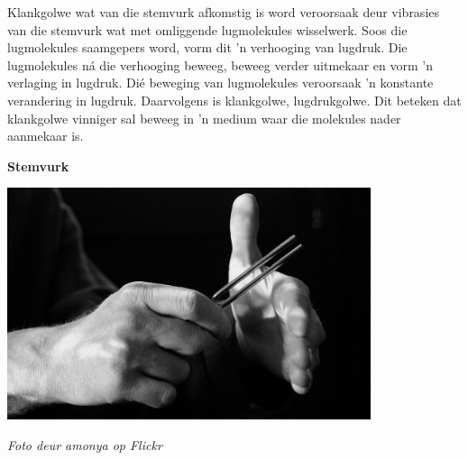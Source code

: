 \begin{minipage}{.5\textwidth}
Klankgolwe wat van die stemvurk afkomstig is word veroorsaak deur vibrasies van die stemvurk wat met omliggende lugmolekules wisselwerk. Soos die lugmolekules saamgepers word, vorm dit  'n verhooging van lugdruk. Die lugmolekules n\'a die verhooging beweeg, beweeg verder uitmekaar en vorm  'n verlaging in lugdruk. Di\'{e} beweging van lugmolekules veroorsaak  'n konstante verandering in lugdruk. Daarvolgens is klankgolwe, lugdrukgolwe. Dit beteken dat klankgolwe vinniger sal beweeg in  'n medium waar die molekules nader aanmekaar is.

\end{minipage}
\begin{minipage}{.5\textwidth}\begin{center}
\textbf{Stemvurk}\par
    \includegraphics[width=0.8\textwidth]{../Grade10/photos/TuningFork2_Flickr_amonya.jpg}\par
\textit{Foto deur amonya op Flickr}
\end{center}
\end{minipage}

